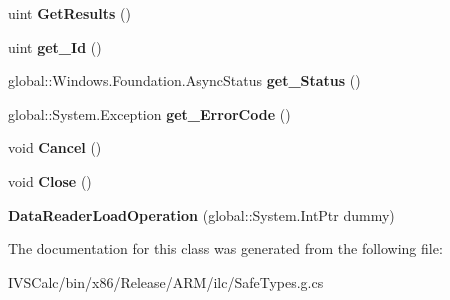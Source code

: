 \begin{DoxyCompactItemize}
uint {\bfseries Get\+Results} ()
\item 
\mbox{\label{class_windows_1_1_storage_1_1_streams_1_1_data_reader_load_operation_a6ef99092e68b2e93880c4edcaf0fd191}} 
uint {\bfseries get\+\_\+\+Id} ()
\item 
\mbox{\label{class_windows_1_1_storage_1_1_streams_1_1_data_reader_load_operation_a7eee8fde2644e8d129c57b70e838cd7d}} 
global\+::\+Windows.\+Foundation.\+Async\+Status {\bfseries get\+\_\+\+Status} ()
\item 
\mbox{\label{class_windows_1_1_storage_1_1_streams_1_1_data_reader_load_operation_a2c6181e3b5357ed9b288bdf9ac27171d}} 
global\+::\+System.\+Exception {\bfseries get\+\_\+\+Error\+Code} ()
\item 
\mbox{\label{class_windows_1_1_storage_1_1_streams_1_1_data_reader_load_operation_afc9128d61314f4f914e6ced27b10551a}} 
void {\bfseries Cancel} ()
\item 
\mbox{\label{class_windows_1_1_storage_1_1_streams_1_1_data_reader_load_operation_a4b0027a73595ac1ed2b96b4c17c64541}} 
void {\bfseries Close} ()
\item 
\mbox{\label{class_windows_1_1_storage_1_1_streams_1_1_data_reader_load_operation_a1bc1b17adae2e272b26f6a612e36b5a9}} 
{\bfseries Data\+Reader\+Load\+Operation} (global\+::\+System.\+Int\+Ptr dummy)
\end{DoxyCompactItemize}


The documentation for this class was generated from the following file\+:\begin{DoxyCompactItemize}
\item 
I\+V\+S\+Calc/bin/x86/\+Release/\+A\+R\+M/ilc/Safe\+Types.\+g.\+cs\end{DoxyCompactItemize}
